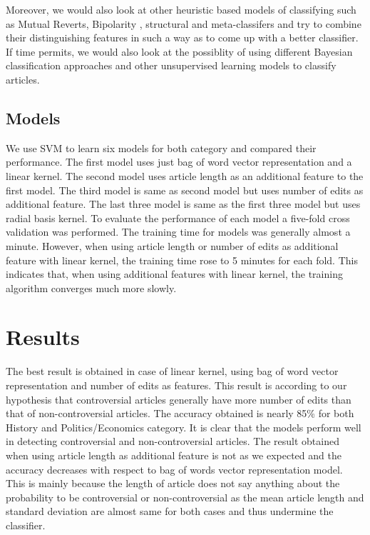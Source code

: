 \documentclass[twocolumn]{article}
\newcommand{\comment}[1]{}
\begin{document}
  Moreover, we would also look at other heuristic based
models of classifying such as Mutual Reverts, Bipolarity , structural
and meta-classifers and try to combine their distinguishing features
in such a way as to come up with a better classifier. If time permits,
we would also look at the possiblity of using different Bayesian
classification approaches and other unsupervised learning models to
classify articles. 

  \subsection{Models}
  	We use SVM to learn six models for both category and compared their
performance. The first model uses just bag of word vector representation
and a linear kernel. The second model uses article length as an additional 
feature to the first model. The third model is same as second model but uses
number of edits as additional feature. The last three model is same as the
first three model but uses radial basis kernel. To evaluate the performance of
each model a five-fold cross validation was performed. The training time for
models was generally almost a minute. However, when using article length or 
number of edits as additional feature with linear kernel, the training time
rose to 5 minutes for each fold. This indicates that, when using additional
features with linear kernel, the training algorithm converges much more slowly.
 \comment{

 Use the following format for figures:

 \begin{figure}[t]
         \centering
         \texttt{[image: figure\_file]}
         \caption{This figure explains this.}
         \label{fig:block}
 \end{figure}

 And refer as Figure \ref{fig:block}.

 }
 \section{Results}

 The best result is obtained in case of linear kernel, using bag of word
 vector representation and number of edits as features. This result is 
 according to our hypothesis that controversial articles generally have 
 more number of edits than that of non-controversial articles. The accuracy 
 obtained is nearly 85\% for both History and Politics/Economics category.
 It is clear that the models perform well in detecting controversial and 
 non-controversial articles. The result obtained when using article length
 as additional feature is not as we expected and the accuracy decreases with
 respect to bag of words vector representation model. This is mainly because
 the length of article does not say anything about the probability to be 
 controversial or non-controversial as the mean article length and standard
 deviation are almost same for both cases and thus undermine the classifier.
 
\end{document}
